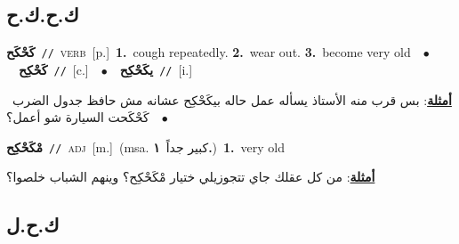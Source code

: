 \documentclass[10pt,a4paper,twoside]{article} %
\begin{document}
\begin{multicols}{2}
\vspace{-3mm}
\subsection*{\color{blue}\foreignlanguage{arabic}{ك.ح.ك.ح}\color{blue}{}} 

{\setlength\topsep{0pt}\textbf{\foreignlanguage{arabic}{كَحْكَح}}\ {\color{gray}\texttt{//}\color{black}}\ \textsc{verb}\ [p.]\ \textbf{1.}~cough repeatedly.  \textbf{2.}~wear out.  \textbf{3.}~become very old\ \ $\bullet$\ \ \setlength\topsep{0pt}\textbf{\foreignlanguage{arabic}{كَحْكِح}}\ {\color{gray}\texttt{//}\color{black}}\ [c.]\ \ $\bullet$\ \ \setlength\topsep{0pt}\textbf{\foreignlanguage{arabic}{يكَحْكِح}}\ {\color{gray}\texttt{//}\color{black}}\ [i.]\  \begin{flushright}\color{gray}\foreignlanguage{arabic}{\textbf{\underline{\foreignlanguage{arabic}{أمثلة}}}: بس قرب منه الأستاذ يسأله عمل حاله بيكَحْكِح عشانه مش حافظ جدول الضرب\ $\bullet$\ \  كَحْكَحت السيارة شو أعمل؟}\end{flushright}\color{black}} \vspace{2mm}

{\setlength\topsep{0pt}\textbf{\foreignlanguage{arabic}{مْكَحْكِح}}\ {\color{gray}\texttt{//}\color{black}}\ \textsc{adj}\ [m.]\ \color{gray}(msa. \foreignlanguage{arabic}{كبير جداً}~\foreignlanguage{arabic}{\textbf{١.}})\color{black}\ \textbf{1.}~very old\  \begin{flushright}\color{gray}\foreignlanguage{arabic}{\textbf{\underline{\foreignlanguage{arabic}{أمثلة}}}: من كل عقلك جاي تتجوزيلي ختيار مْكَحْكِح؟ وينهم الشباب خلصوا؟}\end{flushright}\color{black}} \vspace{2mm}

\vspace{-3mm}
\subsection*{\color{blue}\foreignlanguage{arabic}{ك.ح.ل}\color{blue}{}} 


\end{multicols}
\end{document}
